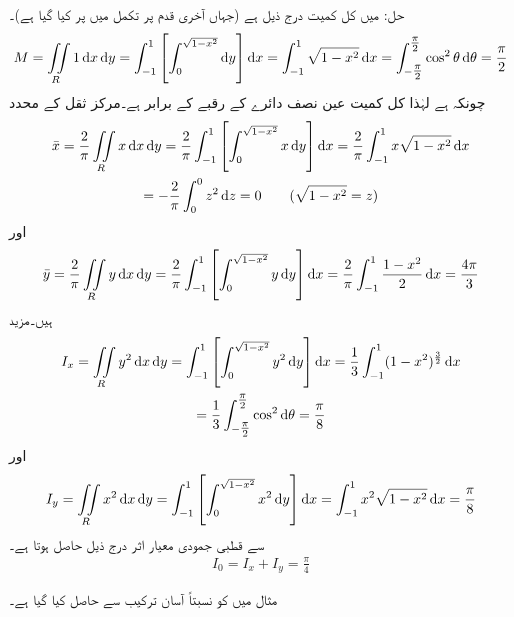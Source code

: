 حل: میں کل کمیت  درج ذیل ہے (جہاں آخری قدم پر تکمل میں  پر کیا گیا ہے)۔
\begin{align*}
M=\iint\limits_R 1\dif x\dif y=\int_{-1}^1 \left[\int_0^{\sqrt{1-x^2}} \dif y\right]\dif x=\int_{-1}^1 \sqrt{1-x^2}\dif x=\int_{-\tfrac{\pi}{2}}^{\tfrac{\pi}{2}}\cos^2 \theta \dif \theta=\frac{\pi}{2}
\end{align*}
چونکہ  ہے لہٰذا کل کمیت عین نصف دائرے کے رقبے کے برابر ہے۔مرکز ثقل کے محدد
\begin{multline*}
\bar{x}=\frac{2}{\pi}\iint\limits_R x\dif x\dif y=\frac{2}{\pi}\int_{-1}^1 \left[\int_{0}^{\sqrt{1-x^2}} x\dif y\right]\dif x=\frac{2}{\pi}\int_{-1}^1 x\sqrt{1-x^2}\dif x\\
=-\frac{2}{\pi}\int_0^0 z^2 \dif z=0\quad \quad (\sqrt{1-x^2}=z)
\end{multline*}
اور
\begin{multline*}
\bar{y}=\frac{2}{\pi}\iint\limits_R y\dif x\dif y=\frac{2}{\pi}\int_{-1}^1 \left[\int_{0}^{\sqrt{1-x^2}} y\dif y\right]\dif x=\frac{2}{\pi}\int_{-1}^1 \frac{1-x^2}{2}\dif x=\frac{4\pi}{3}
\end{multline*}
ہیں۔مزید 
\begin{multline*}
I_x=\iint\limits_R y^2\dif x\dif y=\int_{-1}^{1}\left[\int_0^{\sqrt{1-x^2}}y^2 \dif y \right]\dif x=\frac{1}{3}\int_{-1}^1(1-x^2)^{\frac{3}{2}}\dif x\\
=\frac{1}{3}\int_{-\tfrac{\pi}{2}}^{\tfrac{\pi}{2}} \cos^2 \dif \theta=\frac{\pi}{8}
\end{multline*}
اور
\begin{align*}
I_y=\iint\limits_R x^2\dif x\dif y=\int_{-1}^{1}\left[\int_0^{\sqrt{1-x^2}}x^2 \dif y \right]\dif x=\int_{-1}^1x^2\sqrt{1-x^2}\dif x=\frac{\pi}{8}
\end{align*}
سے قطبی جمودی معیار اثر  درج ذیل حاصل ہوتا ہے۔
\begin{align*}
I_0=I_x+I_y=\frac{\pi}{4}
\end{align*}

مثال  میں  کو نسبتاً آسان ترکیب سے حاصل کیا گیا ہے۔

